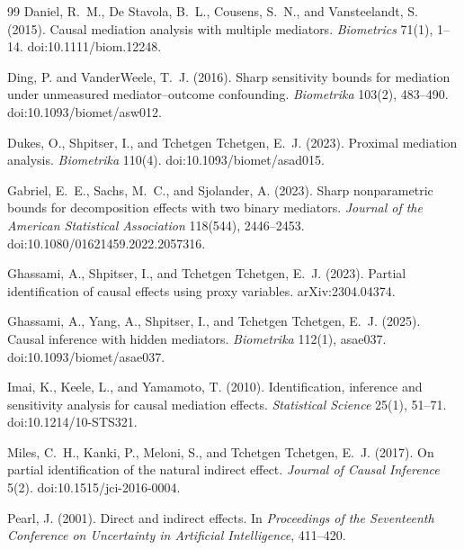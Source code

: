 \documentclass[11pt]{article}
\theoremstyle{definition}
\theoremstyle{plain}
\theoremstyle{remark}
\begin{document}
\begin{thebibliography}{99}
Daniel, R.~M., De Stavola, B.~L., Cousens, S.~N., and Vansteelandt, S. (2015).
\newblock Causal mediation analysis with multiple mediators.
\newblock \emph{Biometrics} 71(1), 1--14. doi:10.1111/biom.12248.

Ding, P. and VanderWeele, T.~J. (2016).
\newblock Sharp sensitivity bounds for mediation under unmeasured
mediator--outcome confounding.
\newblock \emph{Biometrika} 103(2), 483--490. doi:10.1093/biomet/asw012.

Dukes, O., Shpitser, I., and Tchetgen Tchetgen, E.~J. (2023).
\newblock Proximal mediation analysis.
\newblock \emph{Biometrika} 110(4). doi:10.1093/biomet/asad015.

Gabriel, E.~E., Sachs, M.~C., and Sjolander, A. (2023).
\newblock Sharp nonparametric bounds for decomposition effects with two binary
mediators.
\newblock \emph{Journal of the American Statistical Association} 118(544),
2446--2453. doi:10.1080/01621459.2022.2057316.

Ghassami, A., Shpitser, I., and Tchetgen Tchetgen, E.~J. (2023).
\newblock Partial identification of causal effects using proxy variables.
\newblock arXiv:2304.04374.

Ghassami, A., Yang, A., Shpitser, I., and Tchetgen Tchetgen, E.~J. (2025).
\newblock Causal inference with hidden mediators.
\newblock \emph{Biometrika} 112(1), asae037. doi:10.1093/biomet/asae037.

Imai, K., Keele, L., and Yamamoto, T. (2010).
\newblock Identification, inference and sensitivity analysis for causal
mediation effects.
\newblock \emph{Statistical Science} 25(1), 51--71. doi:10.1214/10-STS321.

Miles, C.~H., Kanki, P., Meloni, S., and Tchetgen Tchetgen, E.~J. (2017).
\newblock On partial identification of the natural indirect effect.
\newblock \emph{Journal of Causal Inference} 5(2). doi:10.1515/jci-2016-0004.

Pearl, J. (2001).
\newblock Direct and indirect effects.
\newblock In \emph{Proceedings of the Seventeenth Conference on Uncertainty in
Artificial Intelligence}, 411--420.


\end{thebibliography}
\end{document}
